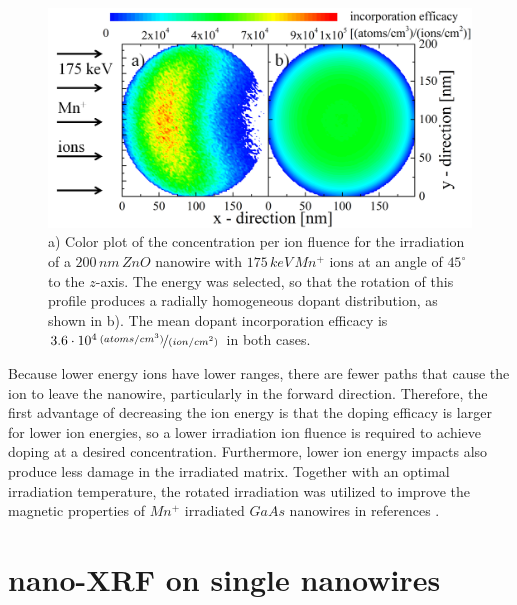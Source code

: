 \begin{figure}
	\centering
		\includegraphics[width=.8\textwidth]{images/iradinacrosssection.png}
	\caption{a) Color plot of the concentration per ion fluence for the irradiation of a $200\,nm\,ZnO$ nanowire with $175\,keV\,Mn^+$ ions at an angle of $45^\circ$ to the $z$-axis. The energy was selected, so that the rotation of this profile produces a radially homogeneous dopant distribution, as shown in b). The mean dopant incorporation efficacy is $3.6\cdot10^4\,\nicefrac{(atoms/cm^3)}{(ion/cm^2)}$ in both cases.}
	\label{iradinacrossection}
\end{figure} 

Because lower energy ions have lower ranges, there are fewer paths that cause the ion to leave the nanowire, particularly in the forward direction. Therefore, the first advantage of decreasing the ion energy is that the doping efficacy is larger for lower ion energies, so a lower irradiation ion fluence is required to achieve doping at a desired concentration. Furthermore, lower ion energy impacts also produce less damage in the irradiated matrix. Together with an optimal irradiation temperature, the rotated irradiation was utilized to improve the magnetic properties of $Mn^+$ irradiated $GaAs$ nanowires in references \cite{borschel_new_2011,paschoal_hopping_2012,borschel_ion-solid_2012,kumar_magnetic_2013,paschoal_magnetoresistance_2014}. 




\section{nano-XRF on single nanowires}

